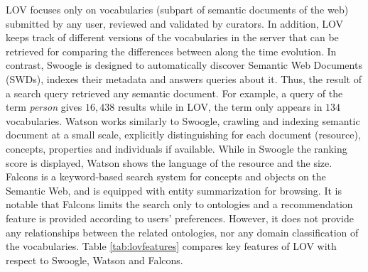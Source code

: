 \documentclass{iosart2c}
\begin{document}
LOV focuses only on vocabularies (subpart of semantic documents of the web) submitted by any user, reviewed and validated by curators. In addition, LOV keeps track of different versions of the vocabularies in the server that can be retrieved for comparing the differences between along the time evolution.  In contrast, Swoogle is designed to automatically discover Semantic Web Documents (SWDs), indexes their metadata and answers queries about it. Thus, the result of a search query retrieved any semantic document. For example, a query of the term \textit{person} gives $16,438$ results while in LOV, the term only appears in $134$ vocabularies.
Watson works similarly to Swoogle, crawling and indexing semantic document at a small scale, explicitly distinguishing for each document (resource), concepts, properties and individuals if available. While in Swoogle  the ranking score is displayed, Watson shows the language of the resource and the size. Falcons is a keyword-based search system for concepts and objects on the Semantic Web, and is equipped with entity summarization for browsing. It is notable that Falcons limits the search only to ontologies and a recommendation feature is provided according to users' preferences. However, it does not provide any relationships between the related ontologies, nor any domain classification of the vocabularies.
Table \ref{tab:lovfeatures} compares key features of LOV with respect to Swoogle, Watson and Falcons.
\end{document}
